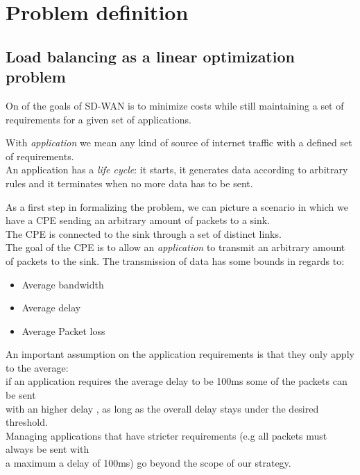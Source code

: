 
\section{Problem definition}

\subsection{Load balancing as a linear optimization problem}

On of the goals of SD-WAN is to minimize costs while still maintaining a set of requirements for a given set of applications. 


\begin{mdframed}[hidealllines=true,backgroundcolor=blue!20]
	With \textit{application} we mean any kind of source of internet traffic with a defined set of requirements. \\
	An application has a \textit{life cycle}: it starts, it generates data according to arbitrary rules and it terminates when no more data has to be sent. 
\end{mdframed} 


As a first step in formalizing the problem,  we can picture a scenario in which we have a CPE sending an arbitrary amount of packets to a sink. \\

The CPE is connected to the sink through a set of distinct links. \\

The goal of the CPE is to allow an \textit{application} to  transmit an arbitrary amount of packets to the sink. The transmission of data has some bounds in regards to:

\begin{itemize}
	\item Average bandwidth
	\item Average delay
	\item Average Packet loss
\end{itemize}


\begin{mdframed}[hidealllines=true,backgroundcolor=blue!20]
	An important assumption on the application requirements is that they only apply to the average: \\ if an application requires the average delay to be 100ms some of the packets can be sent \\ with an higher delay , as long as the overall delay stays under the desired threshold. \\
	Managing applications that have stricter requirements (e.g all packets must always be sent with \\ a maximum a delay of 100ms) go beyond the scope of our strategy.
\end{mdframed} 




